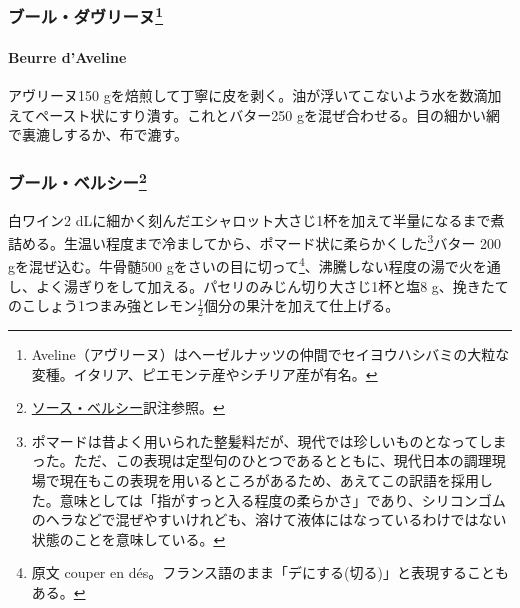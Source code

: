 \begin{recette}
\hypertarget{ux30d6ux30fcux30ebux30c0ux30f4ux30eaux30fcux30cc8}{%
\subsubsection[ブール・ダヴリーヌ]{\texorpdfstring{ブール・ダヴリーヌ\footnote{Aveline（アヴリーヌ）はヘーゼルナッツの仲間でセイヨウハシバミの大粒な変種。イタリア、ピエモンテ産やシチリア産が有名。}}{ブール・ダヴリーヌ}}\label{ux30d6ux30fcux30ebux30c0ux30f4ux30eaux30fcux30cc8}}

\hypertarget{beurre-d-aveline}{%
\paragraph{Beurre d'Aveline}\label{beurre-d-aveline}}


アヴリーヌ150
gを焙煎して丁寧に皮を剥く。油が浮いてこないよう水を数滴加えてペースト状にすり潰す。これとバター250
gを混ぜ合わせる。目の細かい網で裏漉しするか、布で漉す。

\hypertarget{beurre-bercy}{%
\subsubsection[ブール・ベルシー]{\texorpdfstring{ブール・ベルシー\footnote{\protect\hyperlink{sauce-bercy}{ソース・ベルシー}訳注参照。}}{ブール・ベルシー}}\label{beurre-bercy}}



白ワイン2
dLに細かく刻んだエシャロット大さじ1杯を加えて半量になるまで煮詰める。生温い程度まで冷ましてから、ポマード状に柔らかくした\footnote{ポマードは昔よく用いられた整髪料だが、現代では珍しいものとなってしまった。ただ、この表現は定型句のひとつであるとともに、現代日本の調理現場で現在もこの表現を用いるところがあるため、あえてこの訳語を採用した。意味としては「指がすっと入る程度の柔らかさ」であり、シリコンゴムのヘラなどで混ぜやすいけれども、溶けて液体にはなっているわけではない状態のことを意味している。}バター
200 gを混ぜ込む。牛骨髄500 gをさいの目に切って\footnote{原文 couper en
  dés。フランス語のまま「デにする(切る)」と表現することもある。}、沸騰しない程度の湯で火を通し、よく湯ぎりをして加える。パセリのみじん切り大さじ1杯と塩8
g、挽きたてのこしょう1つまみ強とレモン\(\frac{1}{2}\)個分の果汁を加えて仕上げる。


\end{recette}

